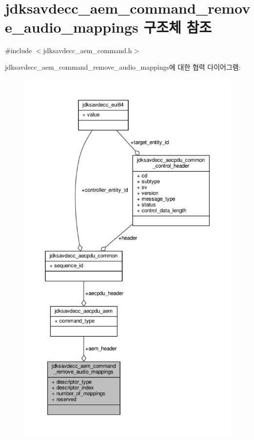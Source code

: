 \hypertarget{structjdksavdecc__aem__command__remove__audio__mappings}{}\section{jdksavdecc\+\_\+aem\+\_\+command\+\_\+remove\+\_\+audio\+\_\+mappings 구조체 참조}
\label{structjdksavdecc__aem__command__remove__audio__mappings}


{\ttfamily \#include $<$jdksavdecc\+\_\+aem\+\_\+command.\+h$>$}



jdksavdecc\+\_\+aem\+\_\+command\+\_\+remove\+\_\+audio\+\_\+mappings에 대한 협력 다이어그램\+:
\nopagebreak
\begin{figure}[H]
\begin{center}
\leavevmode
\includegraphics[height=550pt]{structjdksavdecc__aem__command__remove__audio__mappings__coll__graph}
\end{center}
\end{figure}
